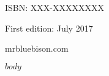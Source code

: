 \documentclass[12pt]{book}
\newcommand\blankpage{%
    \null
    \thispagestyle{empty}%
    \addtocounter{page}{-1}%
    \newpage}
\begin{document}
  ISBN: XXX-XXXXXXXX

  First edition: July 2017

  \vfill
  mrbluebison.com
  \vspace*{2\baselineskip}
  \clearpage
  \endgroup

  \begingroup
  \vspace*{\fill}
  \begin{center}
  \end{center}
  \vspace*{\fill}
  \afterpage{\blankpage}
  \endgroup
  \setcounter{page}{0}
  \clearpage



  \pagestyle{fancy}

  $body$
\end{document}
